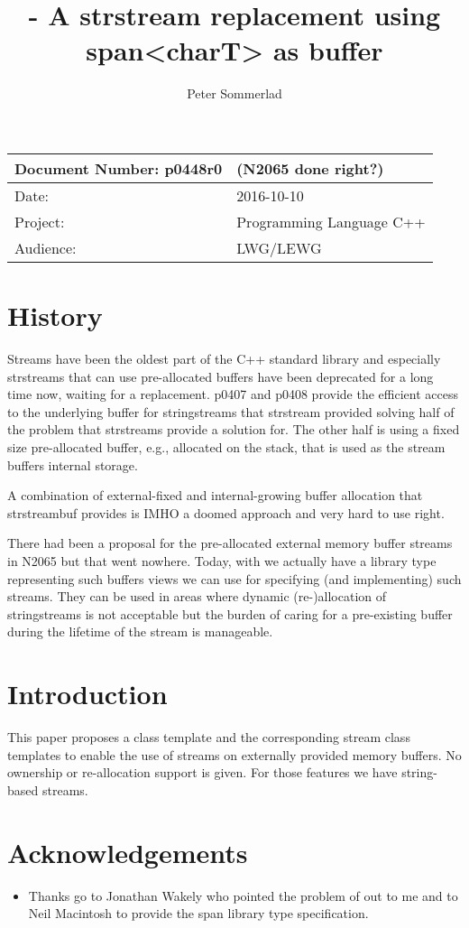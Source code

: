 \documentclass[ebook,11pt,article]{memoir}
\title{\papernumber{} - A strstream replacement using span\textless{}charT\textgreater{} as buffer}
\author{Peter Sommerlad}
\date{\paperdate}                %
\newcommand{\papernumber}{p0448r0}
\newcommand{\paperdate}{2016-10-10}
\begin{document}
\maketitle
\begin{tabular}[t]{|l|l|}\hline 
Document Number: \papernumber & (N2065 done right?)\\\hline
Date: & \paperdate \\\hline
Project: & Programming Language C++\\\hline 
Audience: & LWG/LEWG\\\hline
\end{tabular}

\chapter{History}
Streams have been the oldest part of the C++ standard library and especially strstreams that can use pre-allocated buffers have been deprecated for a long time now, waiting for a replacement. p0407 and p0408 provide the efficient access to the underlying buffer for stringstreams that strstream provided solving half of the problem that strstreams provide a solution for. The other half is using a fixed size pre-allocated buffer, e.g., allocated on the stack, that is used as the stream buffers internal storage.

A combination of external-fixed and internal-growing buffer allocation that strstreambuf provides is IMHO a doomed approach and very hard to use right.

There had been a proposal for the pre-allocated external memory buffer streams in N2065 but that went nowhere. Today, with  we actually have a library type representing such buffers views we can use for specifying (and implementing) such streams. They can be used in areas where dynamic (re-)allocation of stringstreams is not acceptable but the burden of caring for a pre-existing buffer during the lifetime of the stream is manageable. 

\chapter{Introduction}
This paper proposes a class template  and the corresponding stream class templates to enable the use of streams on externally provided memory buffers. No ownership or re-allocation support is given. For those features we have string-based streams.

\chapter{Acknowledgements}
\begin{itemize}
\item Thanks go to Jonathan Wakely who pointed the problem of  out to me and to Neil Macintosh to provide the span library type specification.
\end{itemize}
\end{document}
